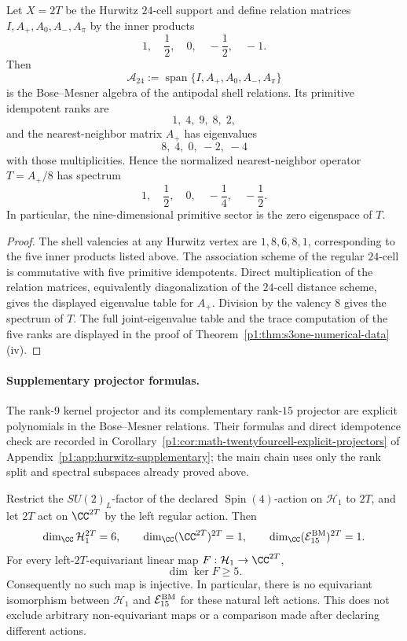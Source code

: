 \documentclass[11pt]{article}
\begin{document}
\begin{proposition}
\label{p1:prop:math-twentyfourcell-bose-mesner}
Let \(X=2T\) be the Hurwitz \(24\)-cell support and define relation matrices \(I,A_+,A_0,A_-,A_\pi\) by the inner products
\[
  1,\quad \frac12,\quad 0,\quad -\frac12,\quad -1.
\]
Then
\[
  \mathcal A_{24}:=\operatorname{span}\{I,A_+,A_0,A_-,A_\pi\}
\]
is the Bose--Mesner algebra of the antipodal shell relations.  Its primitive idempotent ranks are
\[
  1,\;4,\;9,\;8,\;2,
\]
and the nearest-neighbor matrix \(A_+\) has eigenvalues
\[
  8,\;4,\;0,\;-2,\;-4
\]
with those multiplicities.  Hence the normalized nearest-neighbor operator \(T=A_+/8\) has spectrum
\[
  1,\quad \frac12,\quad 0,\quad -\frac14,\quad -\frac12.
\]
In particular, the nine-dimensional primitive sector is the zero eigenspace of \(T\).
\end{proposition}

\begin{proof}
The shell valencies at any Hurwitz vertex are \(1,8,6,8,1\), corresponding to the five inner products listed above.  The association scheme of the regular \(24\)-cell is commutative with five primitive idempotents.  Direct multiplication of the relation matrices, equivalently diagonalization of the \(24\)-cell distance scheme, gives the displayed eigenvalue table for \(A_+\).  Division by the valency \(8\) gives the spectrum of \(T\).
The full joint-eigenvalue table and the trace computation of the five ranks
are displayed in the proof of
Theorem~\ref{p1:thm:s3one-numerical-data}\textup{(iv)}.
\end{proof}

\paragraph{Supplementary projector formulas.}
The rank-\(9\) kernel projector and its complementary rank-\(15\) projector
are explicit polynomials in the Bose--Mesner relations.  Their formulas and
direct idempotence check are recorded in
Corollary~\ref{p1:cor:math-twentyfourcell-explicit-projectors} of
Appendix~\ref{p1:app:hurwitz-supplementary}; the main chain uses only the
rank split and spectral subspaces already proved above.

\begin{proposition}
\label{p1:prop:h1-e15-left-2t-obstruction}
Restrict the \(SU(2)_L\)-factor of the declared \(\operatorname{Spin}(4)\)-action on
\(\mathcal H_1\) to \(2T\), and let \(2T\) act on
\(\CC^{2T}\) by the left regular action.  Then
\[
    \dim_\CC\mathcal H_1^{2T}=6,
    \qquad
    \dim_\CC(\CC^{2T})^{2T}=1,
    \qquad
    \dim_\CC(\mathcal E_{15}^{\rm BM})^{2T}=1.
\]
For every left-\(2T\)-equivariant linear map
\(F:\mathcal H_1\to\CC^{2T}\),
\[
    \dim\ker F\ge5.
\]
Consequently no such map is injective.  In particular, there is no equivariant
isomorphism between \(\mathcal H_1\) and
\(\mathcal E_{15}^{\rm BM}\) for these natural left actions.
This does not exclude arbitrary non-equivariant maps or a comparison made
after declaring different actions.
\end{proposition}
\end{document}
